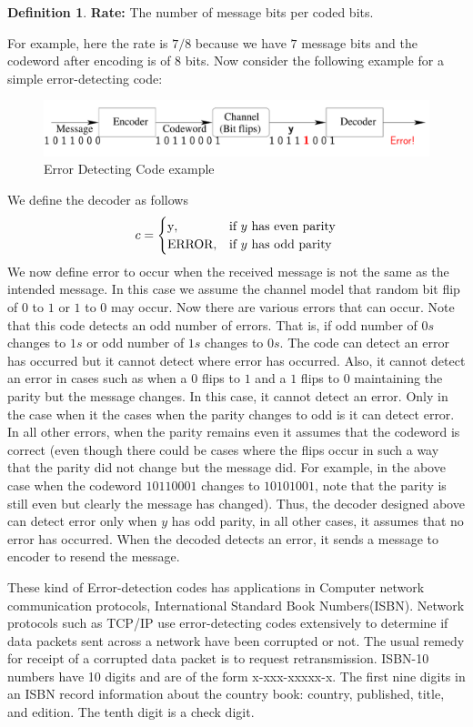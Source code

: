\documentclass[12pt, oneside]{book}
\theoremstyle{definition}
\newtheorem{definition}{Definition}[section]
\theoremstyle{definition}
\theoremstyle{remark}
\begin{document}
\begin{definition}
    \textbf{Rate:} The number of message bits per coded bits.
\end{definition}
For example, here the rate is $7/8$ because we have $7$ message bits and the codeword after encoding is of $8$ bits. Now consider the following example for a simple error-detecting code:
\begin{figure}[h]
    \centering
    \includegraphics[width=0.75\linewidth]{../images/err-det-exa.png}
    \caption{Error Detecting Code example}
    \label{fig:err-exam}
\end{figure}
We define the decoder as follows
\[
c = \begin{cases} 
$y$, & \text{if $y$ has even parity}\\
$ERROR$, &\text{if $y$ has odd parity} 
\end{cases}
\]
We now define error to occur when the received message is not the same as the intended message. In this case we assume the channel model that random bit flip of $0$ to $1$ or $1$ to $0$ may occur. Now there are various errors that can occur. Note that this code detects an odd number of errors. That is, if odd number of $0s$ changes to $1s$ or odd number of $1s$ changes to $0s$. The code can detect an error has occurred but it cannot detect where error has occurred. Also, it cannot detect an error in cases such as when a $0$ flips to $1$ and a $1$ flips to $0$ maintaining the parity but the message changes. In this case, it cannot detect an error. Only in the case when it the cases when the parity changes to odd is it can detect error. In all other errors, when the parity remains even it assumes that the codeword is correct (even though there could be cases where the flips occur in such a way that the parity did not change but the message did. For example, in the above case when the codeword $10110001$ changes to $10101001$, note that the parity is still even but clearly the message has changed). Thus, the decoder designed above can detect error only when $y$ has odd parity, in all other cases, it assumes that no error has occurred. When the decoded detects an error, it sends a message to encoder to resend the message.

These kind of Error-detection codes has applications in Computer network communication protocols, International Standard Book Numbers(ISBN). Network protocols such as TCP/IP use error-detecting codes extensively to determine if data packets sent across a network have been corrupted or not. The usual remedy for receipt of a corrupted data packet is to request retransmission. ISBN-10 numbers have 10 digits and are of the form x-xxx-xxxxx-x. The first nine digits in an ISBN record information about the country book: country, published, title, and edition. The tenth digit is a check digit.
\end{document}
